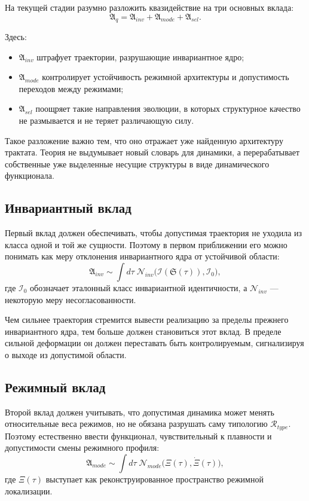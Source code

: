 \documentclass[12pt,a4paper]{article}
\begin{document}
На текущей стадии разумно разложить квазидействие на три основных вклада:
\begin{equation}
\mathfrak{A}_{q}=\mathfrak{A}_{inv}+\mathfrak{A}_{mode}+\mathfrak{A}_{sel}.
\end{equation}

Здесь:
\begin{itemize}
    \item \(\mathfrak{A}_{inv}\) штрафует траектории, разрушающие инвариантное ядро;
    \item \(\mathfrak{A}_{mode}\) контролирует устойчивость режимной архитектуры и допустимость переходов между режимами;
    \item \(\mathfrak{A}_{sel}\) поощряет такие направления эволюции, в которых структурное качество не размывается и не теряет различающую силу.
\end{itemize}

Такое разложение важно тем, что оно отражает уже найденную архитектуру трактата. Теория не выдумывает новый словарь для динамики, а перерабатывает собственные уже выделенные несущие структуры в виде динамического функционала.

\subsection{Инвариантный вклад}

Первый вклад должен обеспечивать, чтобы допустимая траектория не уходила из класса одной и той же сущности. Поэтому в первом приближении его можно понимать как меру отклонения инвариантного ядра от устойчивой области:
\begin{equation}
\mathfrak{A}_{inv}\sim \int d\tau\; \mathcal{N}_{inv}\bigl(\mathcal{I}(\mathfrak{S}(\tau)),\mathcal{I}_0\bigr),
\end{equation}
где \(\mathcal{I}_0\) обозначает эталонный класс инвариантной идентичности, а \(\mathcal{N}_{inv}\) --- некоторую меру несогласованности.

Чем сильнее траектория стремится вывести реализацию за пределы прежнего инвариантного ядра, тем больше должен становиться этот вклад. В пределе сильной деформации он должен переставать быть контролируемым, сигнализируя о выходе из допустимой области.

\subsection{Режимный вклад}

Второй вклад должен учитывать, что допустимая динамика может менять относительные веса режимов, но не обязана разрушать саму типологию \(\mathcal{R}_{type}\). Поэтому естественно ввести функционал, чувствительный к плавности и допустимости смены режимного профиля:
\begin{equation}
\mathfrak{A}_{mode}\sim \int d\tau\; \mathcal{N}_{mode}\bigl(\Xi(\tau),\dot{\Xi}(\tau)\bigr),
\end{equation}
где \(\Xi(\tau)\) выступает как реконструированное пространство режимной локализации.
\end{document}
